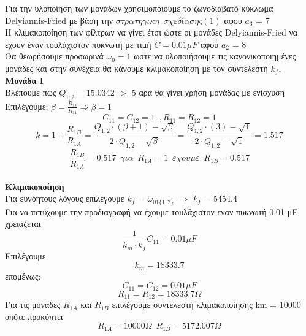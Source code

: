 \documentclass{article}
\begin{document}
{  

\large{}
Για την υλοποίηση των μονάδων χρησιμοποιούμε το ζωνοδιαβατό κύκλωμα Delyiannis-Fried με βάση την $\boxed{στρατηγικη \enspace σχεδίασης (1)}$ αφου $a_3$ = 7 \\ 
Η κλιμακοποίηση των φίλτρων να γίνει έτσι ώστε οι μονάδες
Delyiannis-Fried
να έχουν έναν τουλάχιστον πυκνωτή με τιμή $\boxed{C = 0.01μF}$ αφού $a_2$ = 8
\\[0.4\baselineskip]
Θα θεωρήσουμε προσωρινά $ω_0 = 1$ ωστε να υλοποιήσουμε τις κανονικοποιημένες μονάδες και στην συνέχεια θα κάνουμε κλιμακοποίηση με τον συντελεστή $k_f$.
\\[0.4\baselineskip]
\large{ \underline{\textbf{Μονάδα Ι}} \\[0.4\baselineskip]}
\large{}
Βλέπουμε πως $Q_{1,2} = 15.0342$ $>$ 5 αρα θα γίνει χρήση μονάδας με ενίσχυση
\\[0.4\baselineskip]
Επιλέγουμε: $β = \frac{R_{12}}{R_{11}} \Rightarrow β = 1$ 
\begin{equation*}
C_{11} = C_{12} = 1 \enspace ,R_{11} = R_{12} = 1
\end{equation*}
\begin{equation*}
k = 1 + \frac{R_{1B}}{R_{1A}} = \frac{Q_{1,2} \cdot (β+1) - \sqrt{β}}{2 \cdot Q_{1,2} - \sqrt{β}} = \frac{Q_{1,2} \cdot (3) - \sqrt{1}}{2 \cdot Q_{1,2} - \sqrt{1}} = 1.517
\end{equation*}
\begin{equation*}
\frac{R_{1B}}{R_{1A}} = 0.517 \enspace για \enspace R_{1A} = 1 \enspace εχουμε \enspace R_{1B} = 0.517
\end{equation*}
\\[0.4\baselineskip]
\large{ {\textbf{Κλιμακοποίηση}} \\[0.4\baselineskip]}
\large{}
Για ευνόητους λόγους επιλέγουμε $k_f$ = $ω_{01\{1,2\}}$  $\Rightarrow$ $k_f$ = 5454.4\\[0.4\baselineskip] 
Για να πετύχουμε την προδιαγραφή να έχουμε τουλάχιστον εναν πυκνωτή 0.01 μF χρειάζεται
\begin{equation*}
\frac{1}{k_m \cdot k_f} C_{11}= 0.01μF
\end{equation*}
Επιλέγουμε
\begin{equation*}
k_m =18333.7 
\end{equation*}
επομένως:
\begin{equation*}
\boxed{
C_{11} = C_{12} = 0.01μF
}
\end{equation*}
\begin{equation*}
\boxed{
R_{11} = R_{12} = 18333.7   Ω
}
\end{equation*}
Για τις μονάδες $R_{1A}$ και $R_{1B}$ επιλέγουμε συντελεστή κλιμακοποίησης km = 10000 οπότε προκύπτει
\begin{equation*}
\boxed{R_{1A} = 10000   Ω} \enspace \boxed{R_{1B} = 5172.007 Ω}
\end{equation*}



}
\end{document}
